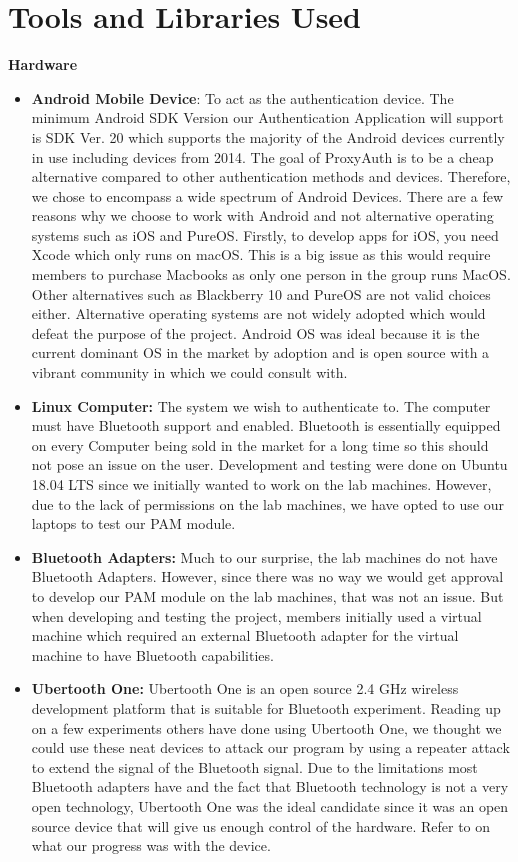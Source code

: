 \documentclass[letterpaper,twocolumn,10pt]{article}
\begin{document}
\section{Tools and Libraries Used}
\textbf{Hardware}
\begin{itemize}[noitemsep]
\item \textbf{Android Mobile Device}: To act as the authentication device. The minimum Android SDK Version our Authentication Application will support is SDK Ver. 20 which supports the majority of the Android devices currently in use including devices from 2014. The goal of ProxyAuth is to be a cheap alternative compared to other authentication methods and devices. Therefore, we chose to encompass a wide spectrum of Android Devices. There are a few reasons why we choose to work with Android and not alternative operating systems such as iOS and PureOS. Firstly, to develop apps for iOS, you need Xcode which only runs on macOS. This is a big issue as this would require members to purchase Macbooks as only one person in the group runs MacOS. Other alternatives such as Blackberry 10 and PureOS are not valid choices either. Alternative operating systems are not widely adopted which would defeat the purpose of the project. Android OS was ideal because it is the current dominant OS in the market by adoption and is open source with a vibrant community in which we could consult with.

\item \textbf{Linux Computer:} The system we wish to authenticate to. The computer must have Bluetooth support and enabled. Bluetooth is essentially equipped on every Computer being sold in the market for a long time so this should not pose an issue on the user. Development and testing were done on Ubuntu 18.04 LTS since we initially wanted to work on the lab machines. However, due to the lack of permissions on the lab machines, we have opted to use our laptops to test our PAM module.

\item \textbf{Bluetooth Adapters:} Much to our surprise, the lab machines do not have Bluetooth Adapters. However, since there was no way we would get approval to develop our PAM module on the lab machines, that was not an issue. But when developing and testing the project, members initially used a virtual machine which required an external Bluetooth adapter for the virtual machine to have Bluetooth capabilities.

\item \textbf{Ubertooth One:} Ubertooth One is an open source 2.4 GHz wireless development platform that is suitable for Bluetooth experiment. Reading up on a few experiments others have done using Ubertooth One, we thought we could use these neat devices to attack our program by using a repeater attack to extend the signal of the Bluetooth signal. Due to the limitations most Bluetooth adapters have and the fact that Bluetooth technology is not a very open technology, Ubertooth One was the ideal candidate since it was an open source device that will give us enough control of the hardware. Refer to \textbf{} on what our progress was with the device.
\end{itemize} 
\end{document}
